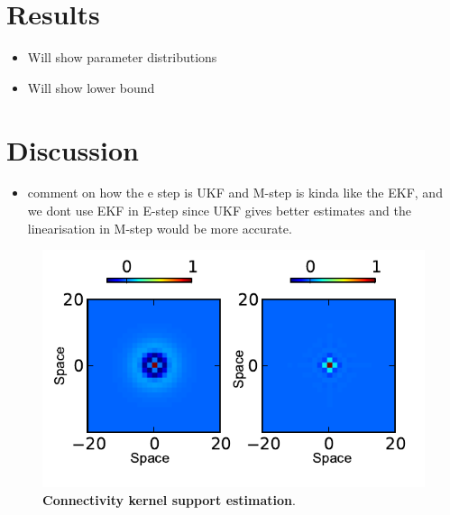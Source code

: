 \documentclass[]{article}
\begin{document}
\section{Results}
\begin{itemize}
	\item Will show parameter distributions
	\item Will show lower bound
\end{itemize}


\section{Discussion}

\begin{itemize}
	\item comment on how the e step is UKF and M-step is kinda like the EKF, and we dont use EKF in E-step since UKF gives better estimates and the linearisation in M-step would be more accurate.  
\end{itemize}

\begin{figure}[!ht]
\begin{center}
\includegraphics{./Figures/KernelWidthEstimation.pdf}
\end{center}
\caption{{\bf Connectivity kernel support estimation}.}
\label{fig:KernelWidthEstimation}
\end{figure}
\end{document}
